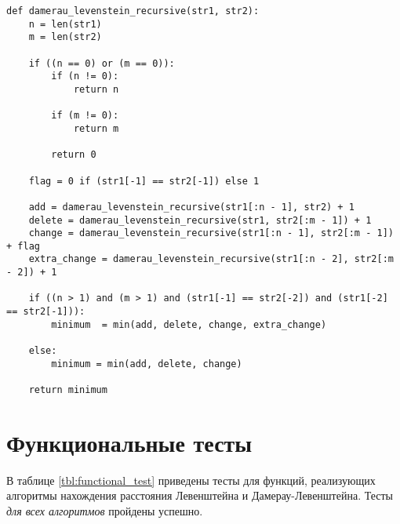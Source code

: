\begin{center}
    \captionsetup{justification=raggedright,singlelinecheck=off}
    \begin{lstlisting}[label=lst:dam_lev_rec,caption=Алгоритм нахождения расстояния Дамерау-Левенштейна (рекурсивный)]
def damerau_levenstein_recursive(str1, str2):
    n = len(str1)
    m = len(str2)

    if ((n == 0) or (m == 0)):
        if (n != 0):
            return n
        
        if (m != 0):
            return m

        return 0

    flag = 0 if (str1[-1] == str2[-1]) else 1

    add = damerau_levenstein_recursive(str1[:n - 1], str2) + 1
    delete = damerau_levenstein_recursive(str1, str2[:m - 1]) + 1
    change = damerau_levenstein_recursive(str1[:n - 1], str2[:m - 1]) + flag
    extra_change = damerau_levenstein_recursive(str1[:n - 2], str2[:m - 2]) + 1

    if ((n > 1) and (m > 1) and (str1[-1] == str2[-2]) and (str1[-2] == str2[-1])):
        minimum  = min(add, delete, change, extra_change)

    else:
        minimum = min(add, delete, change)

    return minimum
\end{lstlisting}
\end{center}

\section{Функциональные тесты}

В таблице \ref{tbl:functional_test} приведены тесты для функций, реализующих алгоритмы нахождения расстояния Левенштейна и Дамерау-Левенштейна. Тесты \textit{для всех алгоритмов} пройдены успешно.

